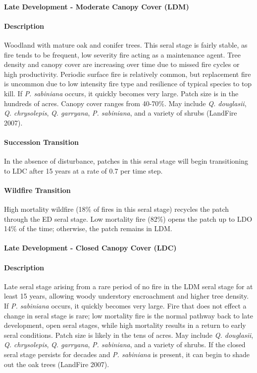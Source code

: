 \noindent\hrulefill

\paragraph{Late Development - Moderate Canopy Cover (LDM)}

\paragraph{Description} Woodland with mature oak and conifer trees. This seral stage is fairly stable, as fire tends to be frequent, low severity fire acting as a maintenance agent. Tree density and canopy cover are increasing over time due to missed fire cycles or high productivity. Periodic surface fire is relatively common, but replacement fire is uncommon due to low intensity fire type and resilience of typical species to top kill. If \emph{P. sabiniana} occurs, it quickly becomes very large. Patch size is  in the hundreds of acres. Canopy cover ranges from 40-70\%. May include \emph{Q. douglasii}, \emph{Q. chrysolepis}, \emph{Q. garryana}, \emph{P. sabiniana}, and a variety of shrubs (LandFire 2007).

\paragraph{Succession Transition} In the absence of disturbance, patches in this seral stage will begin transitioning to LDC after 15 years at a rate of 0.7 per time step. 

\paragraph{Wildfire Transition} High mortality wildfire (18\% of fires in this seral stage) recycles the patch through the ED seral stage. Low mortality fire (82\%) opens the patch up to LDO 14\% of the time; otherwise, the patch remains in LDM.

\noindent\hrulefill

\paragraph{Late Development - Closed Canopy Cover (LDC)}

\paragraph{Description} Late seral stage arising from a rare period of no fire in the LDM seral stage for at least 15 years, allowing woody understory encroachment and higher tree density. If \emph{P. sabiniana} occurs, it quickly becomes very large. Fire that does not effect a change in seral stage is rare; low mortality fire is the normal pathway back to late development, open seral stages, while high mortality results in a return to early seral conditions. Patch size is likely in the tens of acres. May include \emph{Q. douglasii}, \emph{Q. chrysolepis}, \emph{Q. garryana}, \emph{P. sabiniana}, and a variety of shrubs. If the closed seral stage persists for decades and \emph{P. sabiniana} is present, it can begin to shade out the oak trees (LandFire 2007).

